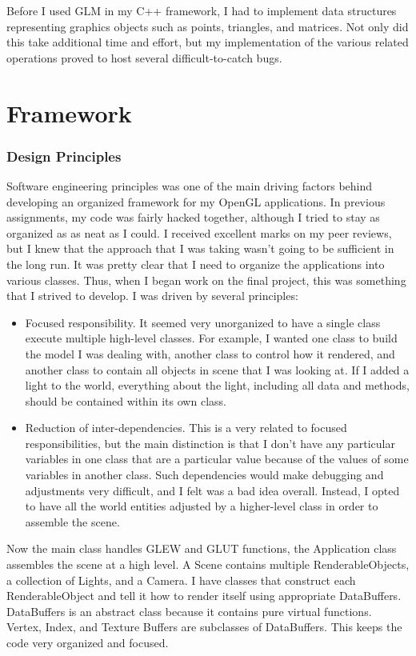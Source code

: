 \documentclass[journal]{IEEEtran}
\begin{document}
Before I used GLM in my C++ framework, I had to implement data structures representing graphics objects such as points, triangles, and matrices. Not only did this take additional time and effort, but my implementation of the various related operations proved to host several difficult-to-catch bugs.

\section{Framework}

\subsubsection{Design Principles}

Software engineering principles was one of the main driving factors behind developing an organized framework for my OpenGL applications. In previous assignments, my code was fairly hacked together, although I tried to stay as organized as as neat as I could. I received excellent marks on my peer reviews, but I knew that the approach that I was taking wasn't going to be sufficient in the long run. It was pretty clear that I need to organize the applications into various classes. Thus, when I began work on the final project, this was something that I strived to develop. I was driven by several principles:
\begin{itemize}
\item Focused responsibility. It seemed very unorganized to have a single class execute multiple high-level classes. For example, I wanted one class to build the model I was dealing with, another class to control how it rendered, and another class to contain all objects in scene that I was looking at. If I added a light to the world, everything about the light, including all data and methods, should be contained within its own class.
\item Reduction of inter-dependencies. This is a very related to focused responsibilities, but the main distinction is that I don't have any particular variables in one class that are a particular value because of the values of some variables in another class. Such dependencies would make debugging and adjustments very difficult, and I felt was a bad idea overall. Instead, I opted to have all the world entities adjusted by a higher-level class in order to assemble the scene.
\end{itemize}

Now the main class handles GLEW and GLUT functions, the Application class assembles the scene at a high level. A Scene contains multiple RenderableObjects, a collection of Lights, and a Camera. I have classes that construct each RenderableObject and tell it how to render itself using appropriate DataBuffers. DataBuffers is an abstract class because it contains pure virtual functions. Vertex, Index, and Texture Buffers are subclasses of DataBuffers. This keeps the code very organized and focused.
\end{document}

